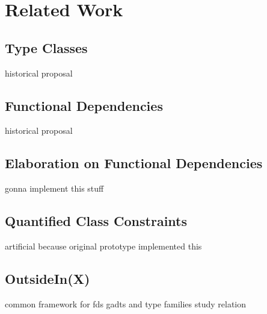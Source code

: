 \section{Related Work}
\subsection{Type Classes}
historical proposal
\subsection{Functional Dependencies}
historical proposal
\subsection{Elaboration on Functional Dependencies}
gonna implement this stuff
\subsection{Quantified Class Constraints}
artificial because original prototype implemented this
\subsection{OutsideIn(X)}
common framework for fds gadts and type families study relation

